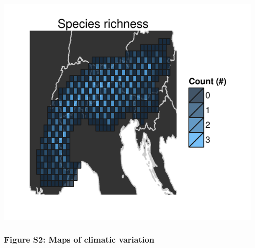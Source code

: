 \documentclass[11pt,]{article}
\let\origfigure\figure
\let\endorigfigure\endfigure
\renewenvironment{figure}[1][2] {
	\expandafter\origfigure\expandafter[H]
} {
	\endorigfigure
}
\begin{document}
\begin{figure}[htbp]
\centering
\includegraphics{article_files/figure-latex/unnamed-chunk-7-1.pdf}
\caption{Species richness. Squares denote planning units. Planning units
with a brighter color are inhabited by more species.}
\end{figure}

\subsubsection{Figure S2: Maps of climatic
variation}\label{figure-s2-maps-of-climatic-variation}
\end{document}
